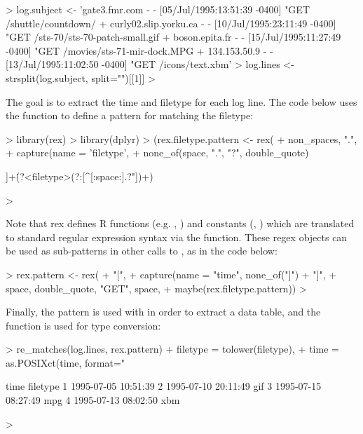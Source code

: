\begin{Schunk}
\begin{Sinput}
> log.subject <- 'gate3.fmr.com - - [05/Jul/1995:13:51:39 -0400] "GET /shuttle/countdown/ 
+ curly02.slip.yorku.ca - - [10/Jul/1995:23:11:49 -0400] "GET /sts-70/sts-70-patch-small.gif
+ boson.epita.fr - - [15/Jul/1995:11:27:49 -0400] "GET /movies/sts-71-mir-dock.MPG
+ 134.153.50.9 - - [13/Jul/1995:11:02:50 -0400] "GET /icons/text.xbm'
> log.lines <- strsplit(log.subject, split="\n")[[1]]
> 
\end{Sinput}
\end{Schunk}

The goal is to extract the time and filetype for
each log line. The code below uses the  function to define a
pattern for matching the filetype: 

\begin{Schunk}
\begin{Sinput}
> library(rex)
> library(dplyr)
> (rex.filetype.pattern <- rex(
+   non_spaces, ".",
+   capture(name = 'filetype',
+           none_of(space, ".", "?", double_quote) %>% one_or_more())))
\end{Sinput}
\begin{Soutput}
[^[:space:]]+\.(?<filetype>(?:[^[:space:].?"])+)
\end{Soutput}
\begin{Sinput}
> 
\end{Sinput}
\end{Schunk}

Note that rex defines R functions (e.g. ,
) and constants (,
) which are translated to standard regular expression
syntax via the  function. These regex objects can be used as
sub-patterns in other calls to , as in the code below:

\begin{Schunk}
\begin{Sinput}
> rex.pattern <- rex(
+   "[",
+   capture(name = "time", none_of("]") %>% zero_or_more()),
+   "]",
+   space, double_quote, "GET", space,
+   maybe(rex.filetype.pattern))
> 
\end{Sinput}
\end{Schunk}

Finally, the pattern is used with  in order to
extract a data table, and the  function is used for type
conversion:

\begin{Schunk}
\begin{Sinput}
> re_matches(log.lines, rex.pattern) %>% mutate(
+   filetype = tolower(filetype),
+   time = as.POSIXct(time, format="%d/%b/%Y:%H:%M:%S %z"))
\end{Sinput}
\begin{Soutput}
                 time filetype
1 1995-07-05 10:51:39         
2 1995-07-10 20:11:49      gif
3 1995-07-15 08:27:49      mpg
4 1995-07-13 08:02:50      xbm
\end{Soutput}
\begin{Sinput}
> 
\end{Sinput}
\end{Schunk}


